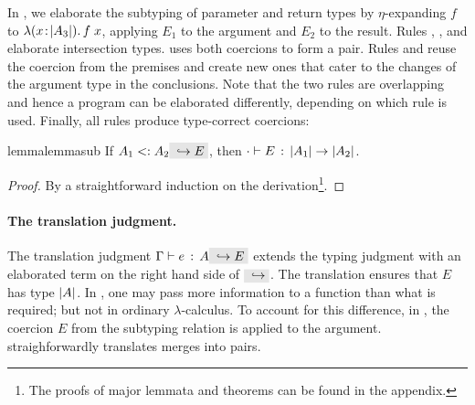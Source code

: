 In , we elaborate the subtyping of
parameter and return types by $\eta$-expanding $f$ to $\lambda (x \!:\! \lvert A_3 \rvert).\, f \; x$, applying $E_1$ to the argument and $E_2$ to the result. Rules
, , and
 elaborate intersection types.
 uses both coercions to form a pair. Rules
 and  reuse the coercion
from the premises and create new ones that cater to the changes of the argument
type in the conclusions. Note that the two rules are overlapping and
hence a program can be elaborated differently, depending on which rule
is used. Finally, all rules produce type-correct coercions:



\begin{restatable}{lemma}{lemmasub}
  \label{lemma:sub}
  If $ A_1 \subtype A_2 \yields E $, then $ \cdot \vdash E \ \!:\! \ \lvert A_1 \rvert \to \lvert A_2 \rvert $.
\end{restatable}

\begin{proof}
  By a straightforward induction on the derivation\footnote{The proofs of major lemmata and theorems can be found in the appendix.}.
\end{proof}

\paragraph{The translation judgment.} The translation judgment $\jtype \Gamma e
A \yields E$ extends the typing judgment with an elaborated term on the right
hand side of $\yields {}$. The translation ensures that $E$ has type $\lvert A \rvert$. In
\name, one may pass more information to a function than what is required; but
not in ordinary $\lambda$-calculus. To account for this difference, in , the
coercion $E$ from the subtyping relation is applied to the argument.
 straighforwardly translates merges into pairs.

